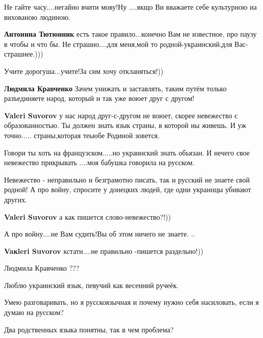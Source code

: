 \begin{itemize}
{\begin{itemize}
Не гайте часу....негайно вчити мову!Ну ....якщо Ви вважаете себе культурною иа вихованою людиною.

\textbf{Антонина Тютюнник} есть такое правило...конечно Вам не известное, про
паузу в чтобы и что бы. Не страшно....для меня,мой то родной-украинский,для
Вас-страшнее.)))

Учите дорогуша...учите!За сим хочу откланяться!))

\textbf{Людмила Кравченко} Зачем унижать и заставлять,
таким путём только разъединяете народ, который и так уже воюет друг с другом!


\textbf{Valeri Suvorov} у нас народ друг-с-другом не воюет, скорее невежество с
образованностью. Ты должен знать язык страны, в которой иы живешь. И уж
точно..... страны,которая теьюбе Родиной зовется.


Говори ты хоть на французском.....но украинский знать обьязан. И нечего свое
невежество прикрывать ....моя бабушка говорила на русском.


Невежество - неправильно и безграмотно писать, так и русский не знаете свой
родной! А про войну, спросите у донецких людей, где одни украинцы убивают
других.

\textbf{Valeri Suvorov} а как пишется слово-невежество?!))

А про войну....не Вам судить!Вы об этом ничего не знаете. ..

\textbf{Vaкleri Suvorov} кстати....не правильно -пишется раздельно!))

Людмила Кравченко ???
\end{itemize}


Люблю украинский язык, певучий как весенний ручеёк.

Умею разговаривать, но я русскоязычная и почему нужно себя насиловать, если я
думаю на русском?

Два родственных языка понятны, так в чем проблема?


}
\end{itemize}
